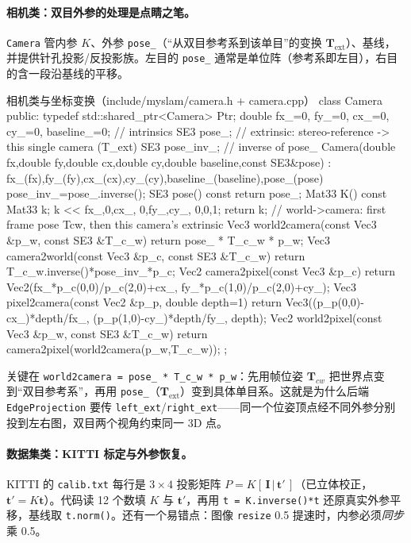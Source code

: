 \paragraph{相机类：双目外参的处理是点睛之笔。}
\texttt{Camera} 管内参 $K$、外参 \texttt{pose\_}（“从双目参考系到该单目”的变换 $\mathbf{T}_{\mathrm{ext}}$）、基线，并提供针孔投影/反投影族。左目的 \texttt{pose\_} 通常是单位阵（参考系即左目），右目的含一段沿基线的平移。

\begin{codebox}[C++]{相机类与坐标变换（include/myslam/camera.h + camera.cpp）}
class Camera {
   public:
    typedef std::shared_ptr<Camera> Ptr;
    double fx_=0, fy_=0, cx_=0, cy_=0, baseline_=0;   // intrinsics
    SE3 pose_;        // extrinsic: stereo-reference -> this single camera (T_ext)
    SE3 pose_inv_;    // inverse of pose_
    Camera(double fx,double fy,double cx,double cy,double baseline,const SE3&pose)
        : fx_(fx),fy_(fy),cx_(cx),cy_(cy),baseline_(baseline),pose_(pose) { pose_inv_=pose_.inverse(); }
    SE3 pose() const { return pose_; }
    Mat33 K() const { Mat33 k; k << fx_,0,cx_, 0,fy_,cy_, 0,0,1; return k; }
    // world->camera: first frame pose Tcw, then this camera's extrinsic
    Vec3 world2camera(const Vec3 &p_w, const SE3 &T_c_w) { return pose_ * T_c_w * p_w; }
    Vec3 camera2world(const Vec3 &p_c, const SE3 &T_c_w) { return T_c_w.inverse()*pose_inv_*p_c; }
    Vec2 camera2pixel(const Vec3 &p_c) {
        return Vec2(fx_*p_c(0,0)/p_c(2,0)+cx_, fy_*p_c(1,0)/p_c(2,0)+cy_);
    }
    Vec3 pixel2camera(const Vec2 &p_p, double depth=1) {
        return Vec3((p_p(0,0)-cx_)*depth/fx_, (p_p(1,0)-cy_)*depth/fy_, depth);
    }
    Vec2 world2pixel(const Vec3 &p_w, const SE3 &T_c_w) { return camera2pixel(world2camera(p_w,T_c_w)); }
};
\end{codebox}

\noindent 关键在 \texttt{world2camera = pose\_ * T\_c\_w * p\_w}：先用帧位姿 $\mathbf{T}_{cw}$ 把世界点变到“双目参考系”，再用 \texttt{pose\_}（$\mathbf{T}_{\mathrm{ext}}$）变到具体单目系。这就是为什么后端 \texttt{EdgeProjection} 要传 \texttt{left\_ext}/\texttt{right\_ext}——同一个位姿顶点经不同外参分别投到左右图，双目两个视角约束同一 3D 点。

\paragraph{数据集类：KITTI 标定与外参恢复。}
KITTI 的 \texttt{calib.txt} 每行是 $3\times4$ 投影矩阵 $P=K[\,\mathbf{I}\,|\,\mathbf{t}'\,]$（已立体校正，$\mathbf{t}'=K\mathbf{t}$）。代码读 12 个数填 $K$ 与 $\mathbf{t}'$，再用 \verb|t = K.inverse()*t| 还原真实外参平移，基线取 \verb|t.norm()|。还有一个易错点：图像 \texttt{resize} 0.5 提速时，内参必须\emph{同步}乘 0.5。

